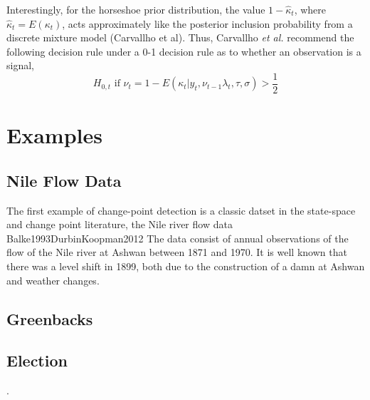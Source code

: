 \documentclass{article}
\begin{document}
Interestingly, for the horseshoe prior distribution, the value $1 - \hat\kappa_{t}$, where $\hat\kappa_{t} = E(\kappa_{t})$, acts approximately like the posterior inclusion probability from a discrete mixture model (Carvallho et al).
Thus, Carvallho \textit{et al.} recommend the following  decision rule under a 0-1 decision rule as to whether an observation is a signal,
\begin{equation}
  \label{eq:5}
  \text{$H_{0,t}$ if $\nu_{t} = 1 - E(\kappa_{t}|y_{t}, \nu_{t-1} \lambda_{t}, \tau, \sigma) > \frac{1}{2}$}
\end{equation}


\section{Examples}
\label{sec:examples}

\subsection{Nile Flow Data}
\label{sec:nile}

The first example of change-point detection is a classic datset in the state-space and change point literature, the Nile river flow data \textcite{Cobb1978}{Balke1993}{DurbinKoopman2012}
The data consist of annual observations of the flow of the Nile river at Ashwan between 1871 and 1970. 
It is well known that there was a level shift in 1899, both due to the construction of a damn at Ashwan and weather changes.

\subsection{Greenbacks}
\label{sec:greenbacks-graybacks}

\subsection{Election}
\label{sec:election}

\textcite{RatkovicEng2010}.

\printbibliography{}
\end{document}
